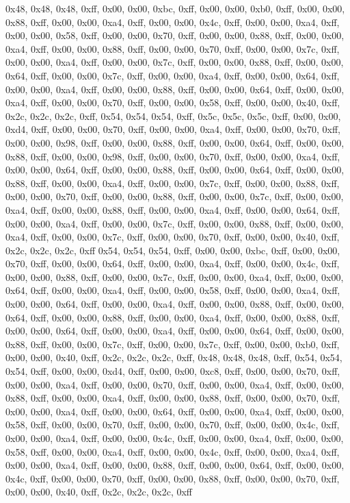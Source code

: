 0x48, 0x48, 0x48, 0xff, 0x00, 0x00, 0xbc, 0xff, 0x00, 0x00, 0xb0, 0xff, 0x00, 0x00, 0x88, 0xff, 0x00, 0x00, 0xa4, 0xff, 0x00, 0x00, 0x4c, 0xff, 0x00, 0x00, 0xa4, 0xff, 0x00, 0x00, 0x58, 0xff, 0x00, 0x00, 0x70, 0xff, 0x00, 0x00, 0x88, 0xff, 0x00, 0x00, 0xa4, 0xff, 0x00, 0x00, 0x88, 0xff, 0x00, 0x00, 0x70, 0xff, 0x00, 0x00, 0x7c, 0xff, 0x00, 0x00, 0xa4, 0xff, 0x00, 0x00, 0x7c, 0xff, 0x00, 0x00, 0x88, 0xff, 0x00, 0x00, 0x64, 0xff, 0x00, 0x00, 0x7c, 0xff, 0x00, 0x00, 0xa4, 0xff, 0x00, 0x00, 0x64, 0xff, 0x00, 0x00, 0xa4, 0xff, 0x00, 0x00, 0x88, 0xff, 0x00, 0x00, 0x64, 0xff, 0x00, 0x00, 0xa4, 0xff, 0x00, 0x00, 0x70, 0xff, 0x00, 0x00, 0x58, 0xff, 0x00, 0x00, 0x40, 0xff, 0x2c, 0x2c, 0x2c, 0xff, 0x54, 0x54, 0x54, 0xff, 0x5c, 0x5c, 0x5c, 0xff, 0x00, 0x00, 0xd4, 0xff, 0x00, 0x00, 0x70, 0xff, 0x00, 0x00, 0xa4, 0xff, 0x00, 0x00, 0x70, 0xff, 0x00, 0x00, 0x98, 0xff, 0x00, 0x00, 0x88, 0xff, 0x00, 0x00, 0x64, 0xff, 0x00, 0x00, 0x88, 0xff, 0x00, 0x00, 0x98, 0xff, 0x00, 0x00, 0x70, 0xff, 0x00, 0x00, 0xa4, 0xff, 0x00, 0x00, 0x64, 0xff, 0x00, 0x00, 0x88, 0xff, 0x00, 0x00, 0x64, 0xff, 0x00, 0x00, 0x88, 0xff, 0x00, 0x00, 0xa4, 0xff, 0x00, 0x00, 0x7c, 0xff, 0x00, 0x00, 0x88, 0xff, 0x00, 0x00, 0x70, 0xff, 0x00, 0x00, 0x88, 0xff, 0x00, 0x00, 0x7c, 0xff, 0x00, 0x00, 0xa4, 0xff, 0x00, 0x00, 0x88, 0xff, 0x00, 0x00, 0xa4, 0xff, 0x00, 0x00, 0x64, 0xff, 0x00, 0x00, 0xa4, 0xff, 0x00, 0x00, 0x7c, 0xff, 0x00, 0x00, 0x88, 0xff, 0x00, 0x00, 0xa4, 0xff, 0x00, 0x00, 0x7c, 0xff, 0x00, 0x00, 0x70, 0xff, 0x00, 0x00, 0x40, 0xff, 0x2c, 0x2c, 0x2c, 0xff
0x54, 0x54, 0x54, 0xff, 0x00, 0x00, 0xbc, 0xff, 0x00, 0x00, 0x70, 0xff, 0x00, 0x00, 0x64, 0xff, 0x00, 0x00, 0xa4, 0xff, 0x00, 0x00, 0x4c, 0xff, 0x00, 0x00, 0x88, 0xff, 0x00, 0x00, 0x7c, 0xff, 0x00, 0x00, 0xa4, 0xff, 0x00, 0x00, 0x64, 0xff, 0x00, 0x00, 0xa4, 0xff, 0x00, 0x00, 0x58, 0xff, 0x00, 0x00, 0xa4, 0xff, 0x00, 0x00, 0x64, 0xff, 0x00, 0x00, 0xa4, 0xff, 0x00, 0x00, 0x88, 0xff, 0x00, 0x00, 0x64, 0xff, 0x00, 0x00, 0x88, 0xff, 0x00, 0x00, 0xa4, 0xff, 0x00, 0x00, 0x88, 0xff, 0x00, 0x00, 0x64, 0xff, 0x00, 0x00, 0xa4, 0xff, 0x00, 0x00, 0x64, 0xff, 0x00, 0x00, 0x88, 0xff, 0x00, 0x00, 0x7c, 0xff, 0x00, 0x00, 0x7c, 0xff, 0x00, 0x00, 0xb0, 0xff, 0x00, 0x00, 0x40, 0xff, 0x2c, 0x2c, 0x2c, 0xff, 0x48, 0x48, 0x48, 0xff, 0x54, 0x54, 0x54, 0xff, 0x00, 0x00, 0xd4, 0xff, 0x00, 0x00, 0xc8, 0xff, 0x00, 0x00, 0x70, 0xff, 0x00, 0x00, 0xa4, 0xff, 0x00, 0x00, 0x70, 0xff, 0x00, 0x00, 0xa4, 0xff, 0x00, 0x00, 0x88, 0xff, 0x00, 0x00, 0xa4, 0xff, 0x00, 0x00, 0x88, 0xff, 0x00, 0x00, 0x70, 0xff, 0x00, 0x00, 0xa4, 0xff, 0x00, 0x00, 0x64, 0xff, 0x00, 0x00, 0xa4, 0xff, 0x00, 0x00, 0x58, 0xff, 0x00, 0x00, 0x70, 0xff, 0x00, 0x00, 0x70, 0xff, 0x00, 0x00, 0x4c, 0xff, 0x00, 0x00, 0xa4, 0xff, 0x00, 0x00, 0x4c, 0xff, 0x00, 0x00, 0xa4, 0xff, 0x00, 0x00, 0x58, 0xff, 0x00, 0x00, 0xa4, 0xff, 0x00, 0x00, 0x4c, 0xff, 0x00, 0x00, 0xa4, 0xff, 0x00, 0x00, 0xa4, 0xff, 0x00, 0x00, 0x88, 0xff, 0x00, 0x00, 0x64, 0xff, 0x00, 0x00, 0x4c, 0xff, 0x00, 0x00, 0x70, 0xff, 0x00, 0x00, 0x88, 0xff, 0x00, 0x00, 0x70, 0xff, 0x00, 0x00, 0x40, 0xff, 0x2c, 0x2c, 0x2c, 0xff
